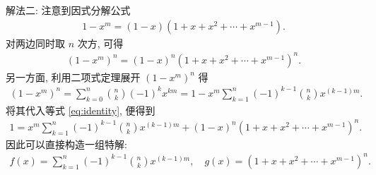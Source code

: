 \documentclass[../../main.tex]{subfiles}%
\begin{document}
\begin{solution}
{\color{blue}解法二:} 
注意到因式分解公式
\begin{align*}
1-x^m=(1-x)(1+x+x^2+\cdots+x^{m-1}).
\end{align*}
对两边同时取 \(n\) 次方, 可得
\begin{align}
(1-x^m)^n=(1-x)^n(1+x+x^2+\cdots+x^{m-1})^n. \label{eq:identity}
\end{align}
另一方面, 利用二项式定理展开 \((1-x^m)^n\) 得
\begin{align*}
(1-x^m)^n =\sum\limits_{k=0}^{n}\binom{n}{k}(-1)^k x^{km} =1-x^{m}\sum\limits_{k=1}^{n}(-1)^{k-1}\binom{n}{k}x^{(k-1)m}.
\end{align*}
将其代入等式 \eqref{eq:identity}, 便得到
\begin{align*}
1=x^{m}\sum\limits_{k=1}^{n}(-1)^{k-1}\binom{n}{k}x^{(k-1)m}+(1-x)^n(1+x+x^2+\cdots+x^{m-1})^n.
\end{align*}
因此可以直接构造一组特解:
\begin{align*}
f(x)  =\sum\limits_{k=1}^{n}(-1)^{k-1}\binom{n}{k}x^{(k-1)m}, \quad
g(x)  =(1+x+x^2+\cdots+x^{m-1})^n.
\end{align*}
\end{solution}
\end{document}
